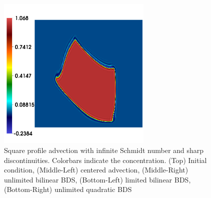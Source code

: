 \documentclass[final]{siamltex}
\begin{document}
\begin{figure}
\begin{center}
\includegraphics[width=2.9in]{square_unl_q_bds}
\caption{Square profile advection with infinite Schmidt number and sharp discontinuities.
Colorbars indicate the concentration.
(Top) Initial condition,
(Middle-Left) centered advection,
(Middle-Right) unlimited bilinear BDS,
(Bottom-Left) limited bilinear BDS,
(Bottom-Right) unlimited quadratic BDS}
\label{fig:square}
\end{center}
\end{figure}
\end{document}
